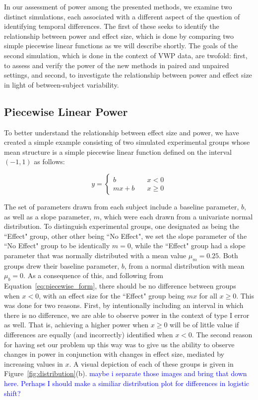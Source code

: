 \documentclass{article}
\providecommand{\cn}[1]{\textcolor{blue}{#1}}
\begin{document}
In our assessment of power among the presented methods, we examine two distinct simulations, each associated with a different aspect of the question of identifying temporal differences. The first of these seeks to identify the relationship between power and effect size, which is done by comparing two simple piecewise linear functions as we will describe shortly. The goals of the second simulation, which is done in the context of VWP data, are twofold: first, to assess and verify the power of the new methods in paired and unpaired settings, and second, to investigate the relationship between power and effect size in light of between-subject variability.

\subsection{Piecewise Linear Power}

To better understand the relationship between effect size and power, we have created a simple example consisting of two simulated experimental groups whose mean structure is a simple piecewise linear function defined on the interval $(-1, 1)$ as follows:


\begin{equation}\label{eq:piecewise_form}
y = \begin{cases}
b \quad &x < 0 \\
mx + b \quad &x \geq 0
\end{cases}
\end{equation}

The set of parameters drawn from each subject include a baseline parameter, $b$, as well as a slope parameter, $m$, which were each drawn from a univariate normal distribution. To distinguish experimental groups, one designated as being the ``Effect" group, other other being ``No Effect", we set the slope parameter of the ``No Effect" group to be identically $m = 0$, while the ``Effect" group had a slope parameter that was normally distributed with a mean value $\mu_m = 0.25$. Both groups drew their baseline parameter, $b$, from a normal distribution with mean $\mu_b = 0$. As a consequence of this, and following from Equation~\ref{eq:piecewise_form}, there should be no difference between groups when $x < 0$, with an effect size for the ``Effect" group being $mx$ for all $x \geq 0$. This was done for two reasons. First, by intentionally including an interval in which there is no difference, we are able to observe power in the context of type I error as well. That is, achieving a higher power when $x \geq 0$ will be of little value if differences are equally (and incorrectly) identified when $x < 0$. The second reason for having set our problem up this way was to give us the ability to observe changes in power in conjunction with changes in effect size, mediated by increasing values in $x$. A visual depiction of each of these groups is given in Figure~\ref{fig:distribution}(b). \cn{maybe i separate those images and bring that down here. Perhaps I should make a similiar distribution plot for differences in logistic shift?}
\end{document}
